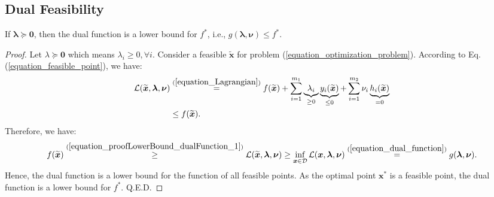 \documentclass[lang=cn,10pt]{gorgeousnbook}
\numberwithin{equation}{section}%
\numberwithin{figure}{section}%
\begin{document}
\subsection{Dual Feasibility}
\begin{lemma}\label{lemma_dual_function_lower_bound}
If $\boldsymbol{\lambda} \succeq \boldsymbol{0}$, then the dual function is a lower bound for $f^*$, i.e., $g(\boldsymbol{\lambda}, \boldsymbol{\nu}) \leq f^*$. 
\end{lemma}
\begin{proof}
Let $\lambda \succeq \boldsymbol{0}$ which means $\lambda_i \geq 0, \forall i$.
Consider a feasible $\widetilde{\boldsymbol{x}}$ for problem (\ref{equation_optimization_problem}). According to Eq. (\ref{equation_feasible_point}), we have:
\begin{align}
\mathcal{L}(\widetilde{\boldsymbol{x}},\boldsymbol{\lambda},\boldsymbol{\nu}) &\overset{(\ref{equation_Lagrangian})}{=} f(\widetilde{\boldsymbol{x}}) + \sum_{i=1}^{m_1} \underbrace{\lambda_i}_{\geq 0} \underbrace{y_i(\widetilde{\boldsymbol{x}})}_{\leq 0} + \sum_{i=1}^{m_2} \nu_i \underbrace{h_i(\widetilde{\boldsymbol{x}})}_{=0} \nonumber\\
&\leq f(\widetilde{\boldsymbol{x}}). \label{equation_proofLowerBound_dualFunction_1}
\end{align}
Therefore, we have:
\begin{align*}
f(\widetilde{\boldsymbol{x}}) \overset{(\ref{equation_proofLowerBound_dualFunction_1})}{\geq} \mathcal{L}(\widetilde{\boldsymbol{x}}, \boldsymbol{\lambda}, \boldsymbol{\nu}) \geq \inf_{\boldsymbol{x} \in \mathcal{D}} \mathcal{L}(\boldsymbol{x}, \boldsymbol{\lambda}, \boldsymbol{\nu}) \overset{(\ref{equation_dual_function})}{=} g(\boldsymbol{\lambda}, \boldsymbol{\nu}).
\end{align*}
Hence, the dual function is a lower bound for the function of all feasible points. As the optimal point $\boldsymbol{x}^*$ is a feasible point, the dual function is a lower bound for $f^*$. Q.E.D.
\end{proof}
\end{document}
